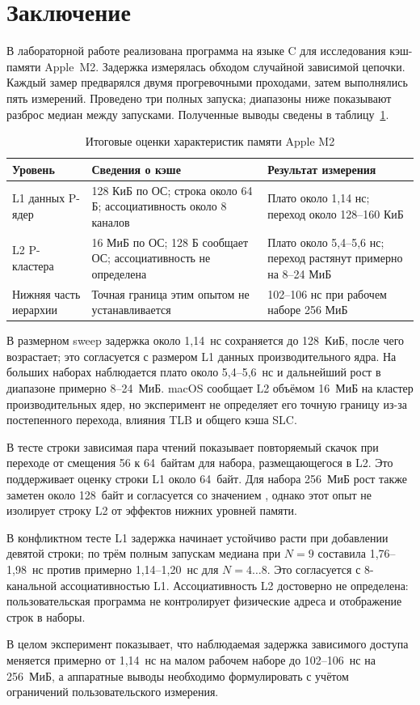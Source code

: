 \newpage
\section{Заключение}

В лабораторной работе реализована программа на языке C для исследования кэш-памяти Apple~M2. Задержка измерялась обходом случайной зависимой цепочки. Каждый замер предварялся двумя прогревочными проходами, затем выполнялись пять измерений. Проведено три полных запуска; диапазоны ниже показывают разброс медиан между запусками. Полученные выводы сведены в таблицу~\ref{tab:result}.

\begin{table}[H]
\centering
\small
\caption{Итоговые оценки характеристик памяти Apple M2}\label{tab:result}
\begin{tabularx}{\textwidth}{lXX}
\toprule
Уровень & Сведения о кэше & Результат измерения \\
\midrule
L1 данных P-ядер & 128 КиБ по ОС; строка около 64 Б; ассоциативность около 8 каналов & Плато около 1,14 нс; переход около 128--160 КиБ \\
L2 P-кластера & 16 МиБ по ОС; 128 Б сообщает ОС; ассоциативность не определена & Плато около 5,4--5,6 нс; переход растянут примерно на 8--24 МиБ \\
Нижняя часть иерархии & Точная граница этим опытом не устанавливается & 102--106 нс при рабочем наборе 256 МиБ \\
\bottomrule
\end{tabularx}
\end{table}

В размерном sweep задержка около 1,14~нс сохраняется до 128~КиБ, после чего возрастает; это согласуется с размером L1 данных производительного ядра. На больших наборах наблюдается плато около 5,4--5,6~нс и дальнейший рост в диапазоне примерно 8--24~МиБ. macOS сообщает L2 объёмом 16~МиБ на кластер производительных ядер, но эксперимент не определяет его точную границу из-за постепенного перехода, влияния TLB и общего кэша SLC.

В тесте строки зависимая пара чтений показывает повторяемый скачок при переходе от смещения 56 к 64~байтам для набора, размещающегося в L2. Это поддерживает оценку строки L1 около 64~байт. Для набора 256~МиБ рост также заметен около 128~байт и согласуется со значением , однако этот опыт не изолирует строку L2 от эффектов нижних уровней памяти.

В конфликтном тесте L1 задержка начинает устойчиво расти при добавлении девятой строки; по трём полным запускам медиана при $N=9$ составила 1,76--1,98~нс против примерно 1,14--1,20~нс для $N=4\ldots8$. Это согласуется с 8-канальной ассоциативностью L1. Ассоциативность L2 достоверно не определена: пользовательская программа не контролирует физические адреса и отображение строк в наборы.

В целом эксперимент показывает, что наблюдаемая задержка зависимого доступа меняется примерно от 1,14~нс на малом рабочем наборе до 102--106~нс на 256~МиБ, а аппаратные выводы необходимо формулировать с учётом ограничений пользовательского измерения.
